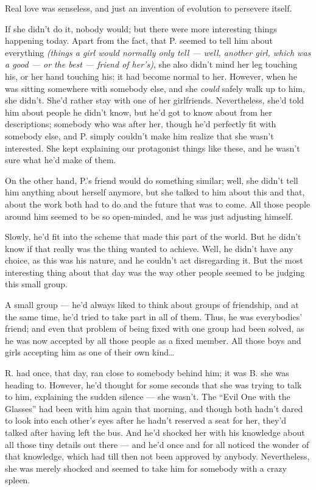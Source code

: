 Real love was senseless, and just an invention of evolution to persevere itself.

If she didn't do it, nobody would; but there were more interesting things happening today. Apart from the fact, that P. seemed to tell him about everything \emph{(things a girl would normally only tell --- well, another girl, which was a good --- or the best --- friend of her's)}, she also didn't mind her leg touching his, or her hand touching his; it had become normal to her. However, when he was sitting somewhere with somebody else, and she \emph{could} safely walk up to him, she didn't. She'd rather stay with one of her girlfriends. Nevertheless, she'd told him about people he didn't know, but he'd got to know about from her descriptions; somebody who was after her, though he'd perfectly fit with somebody else, and P. simply couldn't make him realize that she wasn't interested. She kept explaining our protagonist things like these, and he wasn't sure what he'd make of them.

On the other hand, P.'s friend would do something similar; well, she didn't tell him anything about herself anymore, but she talked to him about this and that, about the work both had to do and the future that was to come. All those people around him seemed to be so open-minded, and he was just adjusting himself.

Slowly, he'd fit into the scheme that made this part of the world. 
But he didn't know if that really was the thing wanted to achieve. Well, he didn't have any choice, as this was his nature, and he couldn't act disregarding it. 
But the most interesting thing about that day was the way other people seemed to be judging this small group.

A small group --- he'd always liked to think about groups of friendship, and at the same time, he'd tried to take part in all of them. Thus, he was everybodies' friend; and even that problem of being fixed with one group had been solved, as he was now accepted by all those people as a fixed member. All those boys and girls accepting him as one of their own kind\ldots

R. had once, that day, ran close to somebody behind him; it was B. she was heading to. However, he'd thought for some seconds that she was trying to talk to him, explaining the sudden silence --- she wasn't. 
The \enquote{Evil One with the Glasses} had been with him again that morning, and though both hadn't dared to look into each other's eyes after he hadn't reserved a seat for her, they'd talked after having left the bus. And he'd shocked her with his knowledge about all those tiny details out there --- and he'd once and for all noticed the wonder of that knowledge, which had till then not been approved by anybody. Nevertheless, she was merely shocked and seemed to take him for somebody with a crazy spleen.


